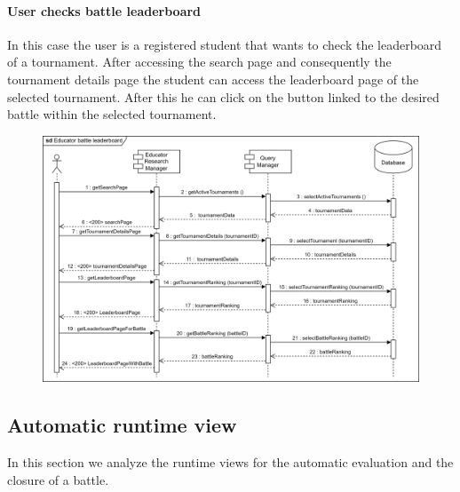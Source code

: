 \documentclass[12pt, a4paper]{report}
\begin{document}
    \paragraph*{User checks battle leaderboard}
    In this case the user is a registered student that wants to check the leaderboard of a tournament. 
    After accessing the search page and consequently the tournament details page the student can access the leaderboard page of the selected tournament. 
    After this he can click on the button linked to the desired battle within the selected tournament. 
    \begin{figure}[H]
        \centering
        \includegraphics[width=1.0\linewidth]{images/eblrv.png}
    \end{figure}

    \subsection{Automatic runtime view}
    In this section we analyze the runtime views for the automatic evaluation and the closure of a battle. 
\end{document}
